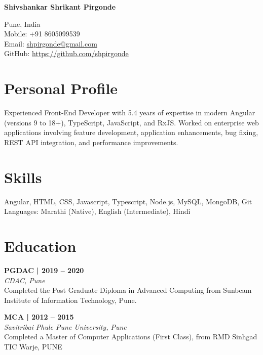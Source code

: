 \documentclass[11pt,a4paper]{article}
\newcommand{\blueitem}[1]{\textcolor{subtitleblue}{\textbf{#1}}}
\begin{document}
{\Huge \textbf{\textcolor{titleblue}{Shivshankar Shrikant Pirgonde}}} \vspace{0.2em}

Pune, India \\
Mobile: +91 8605099539\\
Email: \href{mailto:shpirgonde@gmail.com}{shpirgonde@gmail.com} \\
GitHub: \href{https://github.com/shpirgonde}{https://github.com/shpirgonde}



\vspace{0.2em}

\section*{Personal Profile}
Experienced Front-End Developer with 5.4 years of expertise in modern Angular (versions 9 to 18+), TypeScript, JavaScript, and RxJS. Worked on enterprise web applications involving feature development, application enhancements, bug fixing, REST API integration, and performance improvements.

\section*{Skills}
Angular, HTML, CSS, Javascript, Typescript, Node.js, MySQL, MongoDB, Git\\
Languages: Marathi (Native), English (Intermediate), Hindi

\section*{Education}

\vspace{0.1em}

\blueitem{PGDAC | 2019 -- 2020} \\
\textit{CDAC, Pune} \\
Completed the Post Graduate Diploma in Advanced Computing from Sunbeam Institute of Information Technology, Pune.

\vspace{0.3em}

\blueitem{MCA | 2012 -- 2015} \\
\textit{Savitribai Phule Pune University, Pune} \\
Completed a Master of Computer Applications (First Class), from RMD Sinhgad TIC Warje, PUNE
\end{document}
